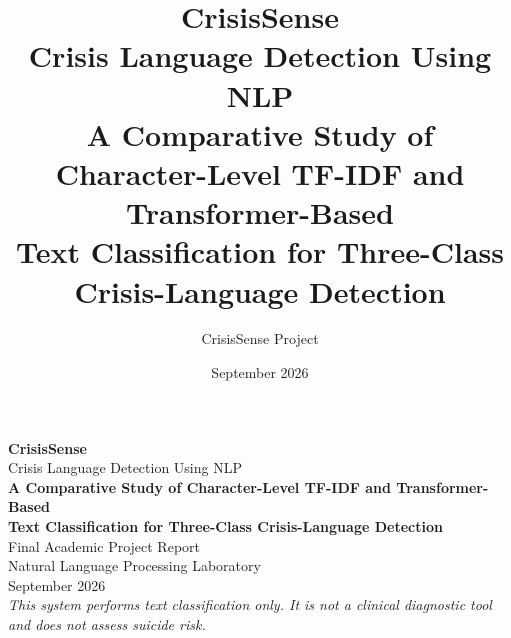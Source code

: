 \documentclass[12pt,a4paper]{report}
\title{
  \vspace{-2cm}
  \Huge\textbf{CrisisSense} \\[0.4cm]
  \Large Crisis Language Detection Using NLP \\[0.2cm]
  \large A Comparative Study of Character-Level TF-IDF and Transformer-Based\\
  Text Classification for Three-Class Crisis-Language Detection
}
\author{CrisisSense Project}
\date{September 2026}
\begin{document}
\begin{titlepage}
\centering
\vspace*{2cm}
{\Huge\textbf{CrisisSense}}\\[0.5cm]
{\Large Crisis Language Detection Using NLP}\\[1.5cm]
{\large\textbf{A Comparative Study of Character-Level TF-IDF and Transformer-Based}}\\
{\large\textbf{Text Classification for Three-Class Crisis-Language Detection}}\\[3cm]
{\large Final Academic Project Report}\\[1cm]
{\large Natural Language Processing Laboratory}\\[3cm]
{\large September 2026}\\
\vfill
\textit{This system performs text classification only. It is not a clinical diagnostic tool and does not assess suicide risk.}
\end{titlepage}

\tableofcontents
\listoffigures
\listoftables
\clearpage
{}


















\appendix

\end{document}
